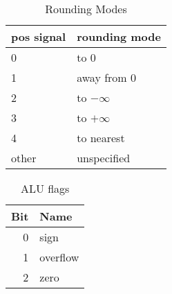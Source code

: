 \begin{table}[ht]
\label{tab:round}
\renewcommand\tabline[2]{#1 & #2\\ \hline}
\begin{center}
\begin{tabular}{|l|l|}
\hline
\tabline {pos signal} {rounding mode}
\hline
\tabline {0}          {to $0$}
\tabline {1}          {away from $0$}
\tabline {2}          {to $-\infty$}
\tabline {3}          {to $+\infty$}
\tabline {4}          {to nearest}
\tabline {other}      {unspecified}
\end{tabular}
\caption{Rounding Modes}
\end{center}
\end{table}

\begin{table}[ht]
\label{tab:flags}
\renewcommand\tabline[2]{#1 & #2\\ \hline}
\begin{center}
\begin{tabular}{|r|l|}
\hline
\tabline {Bit} {Name}
\hline
\tabline {0}   {sign}
\tabline {1}   {overflow}
\tabline {2}   {zero}
\end{tabular}
\caption{ALU flags}
\end{center}
\end{table}

